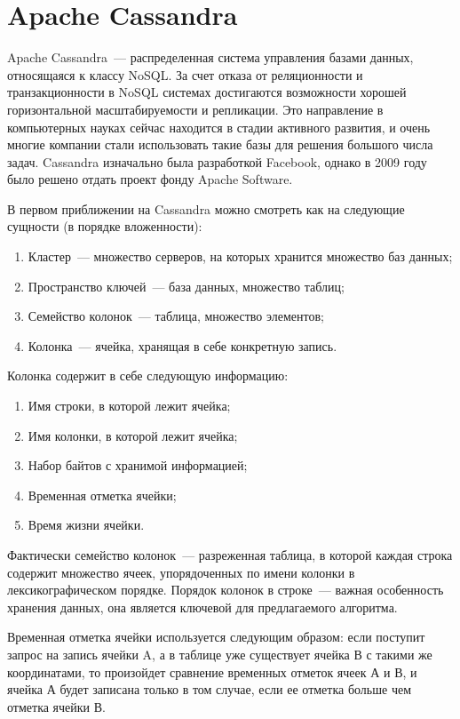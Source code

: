 \section{Apache Cassandra}

Apache Cassandra~--- распределенная система управления базами данных, относящаяся к классу NoSQL. За счет отказа от реляционности и транзакционности в NoSQL системах достигаются возможности хорошей горизонтальной масштабируемости и репликации. Это направление в компьютерных науках сейчас находится в стадии активного развития, и очень многие компании стали использовать такие базы для решения большого числа задач. Cassandra изначально была разработкой Facebook, однако в 2009 году было решено отдать проект фонду Apache Software.

В первом приближении на Cassandra можно смотреть как на следующие сущности (в порядке вложенности):

\begin{enumerate}
	\item Кластер~--- множество серверов, на которых хранится множество баз данных;
	\item Пространство ключей~--- база данных, множество таблиц;
	\item Семейство колонок~--- таблица, множество элементов;
	\item Колонка~--- ячейка, хранящая в себе конкретную запись.
\end{enumerate}

Колонка содержит в себе следующую информацию:

\begin{enumerate}
	\item Имя строки, в которой лежит ячейка;
	\item Имя колонки, в которой лежит ячейка;
	\item Набор байтов с хранимой информацией;
	\item Временная отметка ячейки;
	\item Время жизни ячейки.
\end{enumerate}

Фактически семейство колонок~--- разреженная таблица, в которой каждая строка содержит множество ячеек, упорядоченных по имени колонки в лексикографическом порядке. Порядок колонок в строке~--- важная особенность хранения данных, она является ключевой для предлагаемого алгоритма.

Временная отметка ячейки используется следующим образом: если поступит запрос на запись ячейки A, а в таблице уже существует ячейка В с такими же координатами, то произойдет сравнение временных отметок ячеек А и В, и ячейка А будет записана только в том случае, если ее отметка больше чем отметка ячейки В.

